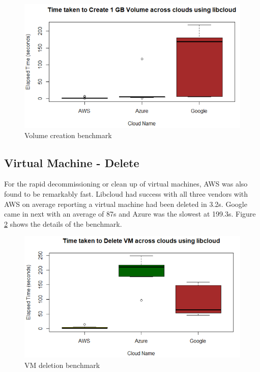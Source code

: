\begin{figure}[!ht]
  \centering
  \includegraphics[width=\columnwidth]{images/Create1GBVol.png}
  \caption{Volume creation benchmark}\label{F:vm-volume}
\end{figure}

\subsection{Virtual Machine - Delete}

For the rapid decommissioning or clean up of virtual machines, AWS was also
found to be remarkably fast. Libcloud had success with all three vendors with
AWS on average reporting a virtual machine had been deleted in 3.2s. Google
came in next with an average of 87s and Azure was the slowest at
199.3s. Figure \ref{F:vm-delete} shows the details of the benchmark.



\begin{figure}[!ht]
  \centering
  \includegraphics[width=\columnwidth]{images/DeleteVM.png}
  \caption{VM deletion benchmark}\label{F:vm-delete}
\end{figure}

